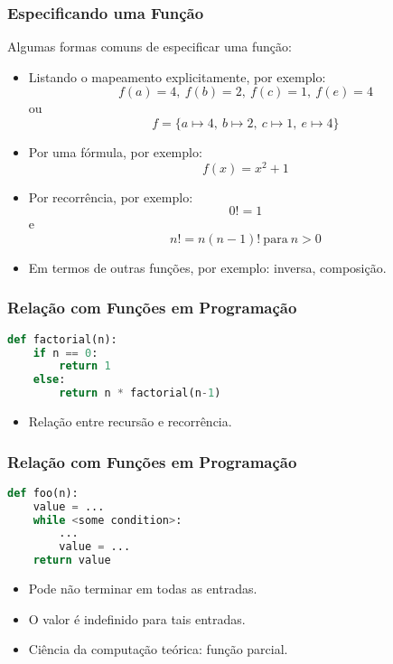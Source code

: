 \begin{frame}
  \frametitle{Especificando uma Função}

  Algumas formas comuns de especificar uma função:
  \begin{itemize}
    \item Listando o mapeamento explicitamente, por exemplo:
    \[ f(a) = 4, \ f(b) = 2, \ f(c) = 1, \ f(e) = 4 \]
    ou
    \[ f = \{a \mapsto 4, \ b \mapsto 2, \ c \mapsto 1, \ e \mapsto 4\} \]
    
    \item Por uma fórmula, por exemplo:
    \[ f(x) = x^2 + 1 \]
    
    \item Por recorrência, por exemplo:
    \[ 0! = 1 \]
    e
    \[ n! = n(n - 1)! \ \text{para} \ n > 0 \]
    
    \item Em termos de outras funções, por exemplo: inversa, composição.
  \end{itemize}
\end{frame}

\begin{frame}[fragile]
  \frametitle{Relação com Funções em Programação}

  \begin{lstlisting}[language=Python, basicstyle=\ttfamily, keywordstyle=\color{blue}, commentstyle=\color{green}, stringstyle=\color{red}]
def factorial(n):
    if n == 0:
        return 1
    else:
        return n * factorial(n-1)
  \end{lstlisting}

  \begin{itemize}
    \item Relação entre recursão e recorrência.
  \end{itemize}
\end{frame}

\begin{frame}[fragile]
  \frametitle{Relação com Funções em Programação}

  \begin{lstlisting}[language=Python, basicstyle=\ttfamily, keywordstyle=\color{blue}, commentstyle=\color{green}, stringstyle=\color{red}]
def foo(n):
    value = ...
    while <some condition>:
        ...
        value = ...
    return value
  \end{lstlisting}

  \begin{itemize}
    \item Pode não terminar em todas as entradas.
    \item O valor é indefinido para tais entradas.
    \item Ciência da computação teórica: função parcial.
  \end{itemize}
\end{frame}

